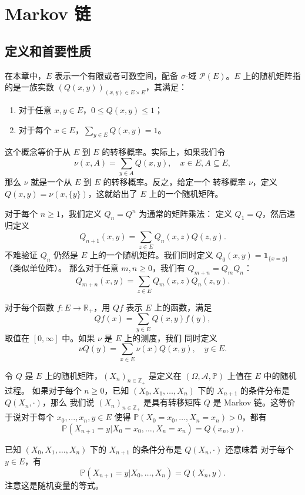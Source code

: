 \documentclass[fontset=none]{Notes}
\newcommand{\indicator}[1]{\mathbold 1_{#1}}
\begin{document}
\chapter{Markov 链}

\section{定义和首要性质}

在本章中，$E$ 表示一个有限或者可数空间，配备 $\sigma$-域
$\mathcal{P}(E)$。$E$ 上的随机矩阵指的是一族实数 
$(Q(x,y))_{(x,y)\in E\times E}$，其满足：
\begin{enumerate}
  \item 对于任意 $x,y\in E$，$0\leq Q(x,y)\leq 1$；
  \item 对于每个 $x\in E$，$\sum_{y\in E}Q(x,y)=1$。
\end{enumerate}

这个概念等价于从 $E$ 到 $E$ 的转移概率。实际上，如果我们令
\[
  \nu(x,A)=\sum_{y\in A}Q(x,y),\quad x\in E,A\subseteq E,  
\]
那么 $\nu$ 就是一个从 $E$ 到 $E$ 的转移概率。反之，给定一个
转移概率 $\nu$，定义 $Q(x,y)=\nu(x,\{y\})$，这就给出了 
$E$ 上的一个随机矩阵。

对于每个 $n\geq 1$，我们定义 $Q_n=Q^n$ 为通常的矩阵乘法：
定义 $Q_1=Q$，然后递归定义
\[
  Q_{n+1}(x,y)=\sum_{z\in E}Q_n(x,z)Q(z,y).  
\]
不难验证 $Q_n$ 仍然是 $E$ 上的一个随机矩阵。我们同时定义
$Q_0(x,y)=\indicator{\{x=y\}}$（类似单位阵）。
那么对于任意 $m,n\geq 0$，我们有 $Q_{m+n}=Q_mQ_n$：
\[
  Q_{m+n}(x,y)=\sum_{z\in E}Q_m(x,z)Q_n(z,y).  
\]

对于每个函数 $f:E\to \mathbb{R}_+$，用 $Qf$ 表示 $E$
上的函数，满足
\[
  Qf(x)=\sum_{y\in E}Q(x,y)f(y),  
\]
取值在 $[0,\infty]$ 中。如果 $\nu$ 是 $E$ 上的测度，我们
同时定义
\[
  \nu Q(y)=\sum_{x\in E}\nu(x)Q(x,y),\quad y\in E.  
\]

\begin{definition}
  令 $Q$ 是 $E$ 上的随机矩阵，$(X_n)_{n\in \mathbb{Z}_+}$
  是定义在 $(\Omega,\mathcal{A},\mathbb{P})$ 上值在 $E$ 中的随机过程。
  如果对于每个 $n\geq 0$，已知 $(X_0,X_1,\dots,X_n)$ 下的
  $X_{n+1}$ 的条件分布是 $Q(X_n,\cdot)$，那么 
  我们说 $(X_n)_{n\in \mathbb{Z}_+}$ 是具有转移矩阵 $Q$
  是 Markov 链。这等价于说对于每个 $x_0,\dots,x_n,y\in E$
  使得 $\mathbb{P}(X_0=x_0,\dots,X_n=x_n)>0$，都有
  \[
    \mathbb{P}(X_{n+1}=y|X_0=x_0,\dots,X_n=x_n)=Q(x_n,y).  
  \]
\end{definition}

已知 $(X_0,X_1,\dots,X_n)$ 下的 $X_{n+1}$ 的条件分布是 $Q(X_n,\cdot)$ 还意味着
对于每个 $y\in E$，有
\[
  \mathbb{P}(X_{n+1}=y|X_0,\dots,X_n)=Q(X_n,y).
\]
注意这是随机变量的等式。
\end{document}
